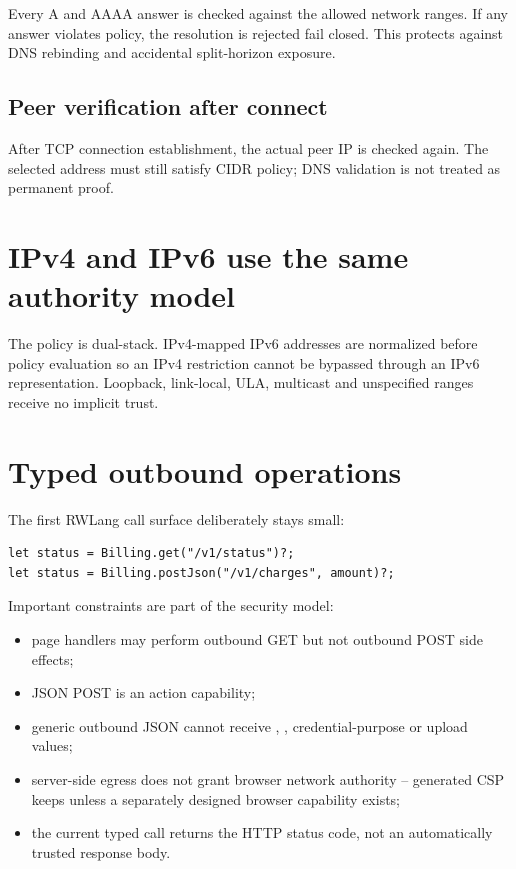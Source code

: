 Every A and AAAA answer is checked against the allowed network ranges. If any answer violates policy, the resolution is rejected fail closed. This protects against DNS rebinding and accidental split-horizon exposure.

\subsection*{Peer verification after connect}

After TCP connection establishment, the actual peer IP is checked again. The selected address must still satisfy CIDR policy; DNS validation is not treated as permanent proof.

\section{IPv4 and IPv6 use the same authority model}

The policy is dual-stack. IPv4-mapped IPv6 addresses are normalized before policy evaluation so an IPv4 restriction cannot be bypassed through an IPv6 representation. Loopback, link-local, ULA, multicast and unspecified ranges receive no implicit trust.

\section{Typed outbound operations}

The first RWLang call surface deliberately stays small:

\begin{lstlisting}[language=RWLang]
let status = Billing.get("/v1/status")?;
let status = Billing.postJson("/v1/charges", amount)?;
\end{lstlisting}

Important constraints are part of the security model:

\begin{itemize}
  \item page handlers may perform outbound GET but not outbound POST side effects;
  \item JSON POST is an action capability;
  \item generic outbound JSON cannot receive , , credential-purpose or upload values;
  \item server-side egress does not grant browser network authority -- generated CSP keeps  unless a separately designed browser capability exists;
  \item the current typed call returns the HTTP status code, not an automatically trusted response body.
\end{itemize}


